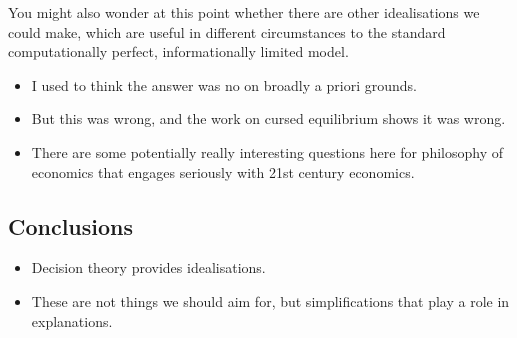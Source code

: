 \documentclass[
  11pt,
  letterpaper,
  DIV=11,
  numbers=noendperiod,
  oneside]{scrartcl}
\providecommand{\tightlist}{%
  \setlength{\itemsep}{0pt}\setlength{\parskip}{0pt}}\usepackage{longtable,booktabs,array}
\begin{document}
You might also wonder at this point whether there are other
idealisations we could make, which are useful in different circumstances
to the standard computationally perfect, informationally limited model.

\begin{itemize}
\tightlist
\item
  I used to think the answer was no on broadly a priori grounds.
\item
  But this was wrong, and the work on cursed equilibrium shows it was
  wrong.
\item
  There are some potentially really interesting questions here for
  philosophy of economics that engages seriously with 21st century
  economics.
\end{itemize}

\subsection{Conclusions}\label{conclusions}

\begin{itemize}
\tightlist
\item
  Decision theory provides idealisations.
\item
  These are not things we should aim for, but simplifications that play
  a role in explanations.
\end{itemize}
\end{document}
